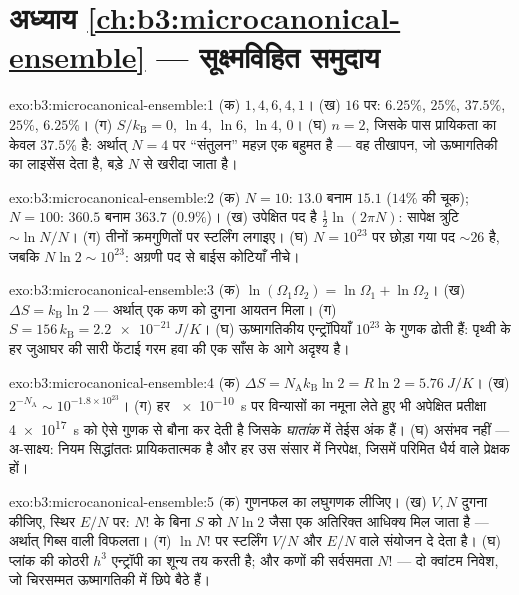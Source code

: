 \section*{अध्याय \ref{ch:b3:microcanonical-ensemble} --- सूक्ष्मविहित समुदाय}

\begin{solution}{exo:b3:microcanonical-ensemble:1}
(क) $1, 4, 6, 4, 1$। (ख) $16$ पर: $6.25\%$, $25\%$, $37.5\%$,
$25\%$, $6.25\%$। (ग) $S/k_{\text{B}} = 0$, $\ln4$, $\ln6$, $\ln4$,
$0$। (घ) $n = 2$, जिसके पास प्रायिकता का केवल $37.5\%$ है: अर्थात्
$N = 4$ पर ``संतुलन'' महज़ एक बहुमत है --- वह तीखापन, जो ऊष्मागतिकी
का लाइसेंस देता है, बड़े $N$ से खरीदा जाता है।
\end{solution}

\begin{solution}{exo:b3:microcanonical-ensemble:2}
(क) $N = 10$: $13.0$ बनाम $15.1$ ($14\%$ की चूक); $N = 100$:
$360.5$ बनाम $363.7$ ($0.9\%$)। (ख) उपेक्षित पद है
$\tfrac12\ln(2\pi N)$: सापेक्ष त्रुटि $\sim\ln N/N$। (ग) तीनों
क्रमगुणितों पर स्टर्लिंग लगाइए। (घ) $N = 10^{23}$ पर छोड़ा गया
पद $\sim26$ है, जबकि $N\ln2 \sim 10^{23}$: अग्रणी पद से बाईस कोटियाँ
नीचे।
\end{solution}

\begin{solution}{exo:b3:microcanonical-ensemble:3}
(क) $\ln(\Omega_1\Omega_2) = \ln\Omega_1 + \ln\Omega_2$। (ख)
$\Delta S = k_{\text{B}}\ln2$ --- अर्थात् एक कण को दुगना आयतन
मिला। (ग) $S = 156\,k_{\text{B}} = \qty{2.2e-21}{J/K}$। (घ)
ऊष्मागतिकीय एन्ट्रॉपियाँ $10^{23}$ के गुणक ढोती हैं: पृथ्वी के हर
जुआघर की सारी फेंटाई गरम हवा की एक साँस के आगे अदृश्य है।
\end{solution}

\begin{solution}{exo:b3:microcanonical-ensemble:4}
(क) $\Delta S = N_{\text{A}}k_{\text{B}}\ln2 = R\ln2 =
\qty{5.76}{J/K}$। (ख) $2^{-N_{\text{A}}} \sim 10^{-1.8\times
10^{23}}$। (ग) हर \qty{e-10}{s} पर विन्यासों का नमूना लेते हुए भी
अपेक्षित प्रतीक्षा \qty{4e17}{s} को ऐसे गुणक से बौना कर देती है
जिसके \emph{घातांक} में तेईस अंक हैं। (घ) असंभव नहीं ---
अ-साक्ष्य: नियम सिद्धांततः प्रायिकतात्मक है और हर उस संसार में
निरपेक्ष, जिसमें परिमित धैर्य वाले प्रेक्षक हों।
\end{solution}

\begin{solution}{exo:b3:microcanonical-ensemble:5}
(क) गुणनफल का लघुगणक लीजिए। (ख) $V, N$ दुगना कीजिए, स्थिर $E/N$
पर: $N!$ के बिना $S$ को $N\ln2$ जैसा एक अतिरिक्त आधिक्य मिल जाता
है --- अर्थात् गिब्स वाली विफलता। (ग) $\ln N!$ पर स्टर्लिंग
$V/N$ और $E/N$ वाले संयोजन दे देता है। (घ) प्लांक की कोठरी $h^3$
एन्ट्रॉपी का शून्य तय करती है; और कणों की सर्वसमता $N!$ --- दो
क्वांटम निवेश, जो चिरसम्मत ऊष्मागतिकी में छिपे बैठे हैं।
\end{solution}

